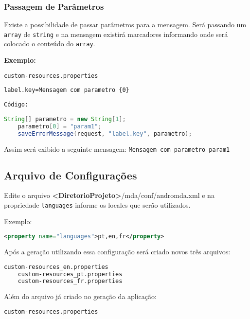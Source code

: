 \subsubsection{Passagem de Parâmetros}

Existe a possibilidade de passar parâmetros para a mensagem. Será passando um
\texttt{array} de \texttt{string} e na mensagem existirá marcadores informando
onde será colocado o conteúdo do \texttt{array}.

\textbf{Exemplo:}

\texttt{custom-resources.properties}

\begin{lstlisting}[language=xml, frame=single, breaklines=true]
	label.key=Mensagem com parametro {0}
\end{lstlisting}

\texttt{Código:}

\begin{lstlisting}[language=java, frame=single, breaklines=true]
	String[] parametro = new String[1];
	parametro[0] = "param1";
	saveErrorMessage(request, "label.key", parametro);
\end{lstlisting}

Assim será exibido a seguinte mensagem: \texttt{Mensagem com
parametro param1}

\subsection{Arquivo de Configurações}

Edite o arquivo \textbf{<DiretorioProjeto>}/mda/conf/andromda.xml e na
propriedade \texttt{languages} informe os locales que serão utilizados.

Exemplo:

\begin{lstlisting}[language=xml, frame=single, breaklines=true]
	<property name="languages">pt,en,fr</property>
\end{lstlisting}

Após a geração utilizando essa configuração será criado novos três arquivos: 

\begin{lstlisting}[language=xml, frame=single, breaklines=true]
	custom-resources_en.properties
	custom-resources_pt.properties
	custom-resources_fr.properties
\end{lstlisting}

Além do arquivo já criado no geração da aplicação:

\begin{lstlisting}[language=xml, frame=single, breaklines=true]
	custom-resources.properties
\end{lstlisting}

